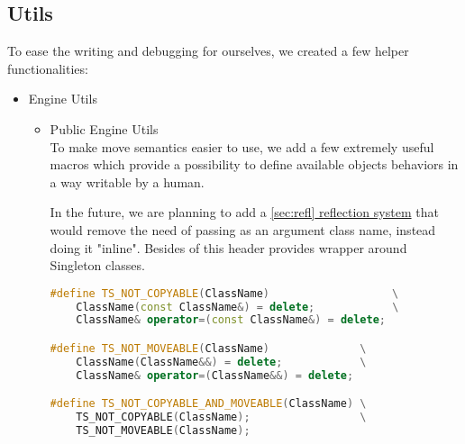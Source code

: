 \newpage
\subsection{Utils}
\label{sec:utils}
To ease the writing and debugging for ourselves, we created a few helper functionalities:
\begin{itemize}
    \item Engine Utils
    \begin{itemize}
        \item Public Engine Utils\\
        To make move semantics easier to use, we add a few extremely useful macros which provide a possibility to define available objects behaviors in a way writable by a human.
        
        In the future, we are planning to add a \hyperref[sec:refl]{\ref*{sec:refl} reflection system} that would remove the need of passing as an argument class name, instead doing it "inline". Besides of this header provides wrapper around Singleton classes.\\
        
\begin{lstlisting}[language=c++, caption=Preprocessor definitions of public Engine Utils (./engine/include/tsengine/utils.hpp)]
#define TS_NOT_COPYABLE(ClassName)                   \
    ClassName(const ClassName&) = delete;            \
    ClassName& operator=(const ClassName&) = delete;

#define TS_NOT_MOVEABLE(ClassName)              \
    ClassName(ClassName&&) = delete;            \
    ClassName& operator=(ClassName&&) = delete;

#define TS_NOT_COPYABLE_AND_MOVEABLE(ClassName) \
    TS_NOT_COPYABLE(ClassName);                 \
    TS_NOT_MOVEABLE(ClassName);


\end{lstlisting}
\end{itemize}
\end{itemize}

